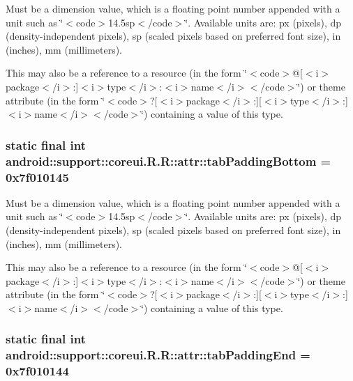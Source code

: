 Must be a dimension value, which is a floating point number appended with a unit such as \char`\"{}$<$code$>$14.5sp$<$/code$>$\char`\"{}. Available units are: px (pixels), dp (density-independent pixels), sp (scaled pixels based on preferred font size), in (inches), mm (millimeters). 

This may also be a reference to a resource (in the form \char`\"{}$<$code$>$@\mbox{[}$<$i$>$package$<$/i$>$:\mbox{]}$<$i$>$type$<$/i$>$:$<$i$>$name$<$/i$>$$<$/code$>$\char`\"{}) or theme attribute (in the form \char`\"{}$<$code$>$?\mbox{[}$<$i$>$package$<$/i$>$:\mbox{]}\mbox{[}$<$i$>$type$<$/i$>$:\mbox{]}$<$i$>$name$<$/i$>$$<$/code$>$\char`\"{}) containing a value of this type. \hypertarget{classandroid_1_1support_1_1coreui_1_1_r_1_1attr_3355ae25fdc31dd76bb81508ba403a86}{
\subsubsection[{tabPaddingBottom}]{\setlength{\rightskip}{0pt plus 5cm}static final int android::support::coreui.R.R::attr::tabPaddingBottom = 0x7f010145}}
\label{classandroid_1_1support_1_1coreui_1_1_r_1_1attr_3355ae25fdc31dd76bb81508ba403a86}


Must be a dimension value, which is a floating point number appended with a unit such as \char`\"{}$<$code$>$14.5sp$<$/code$>$\char`\"{}. Available units are: px (pixels), dp (density-independent pixels), sp (scaled pixels based on preferred font size), in (inches), mm (millimeters). 

This may also be a reference to a resource (in the form \char`\"{}$<$code$>$@\mbox{[}$<$i$>$package$<$/i$>$:\mbox{]}$<$i$>$type$<$/i$>$:$<$i$>$name$<$/i$>$$<$/code$>$\char`\"{}) or theme attribute (in the form \char`\"{}$<$code$>$?\mbox{[}$<$i$>$package$<$/i$>$:\mbox{]}\mbox{[}$<$i$>$type$<$/i$>$:\mbox{]}$<$i$>$name$<$/i$>$$<$/code$>$\char`\"{}) containing a value of this type. \hypertarget{classandroid_1_1support_1_1coreui_1_1_r_1_1attr_e0c82387f7d8b4eefa63e679f6ef6337}{
\subsubsection[{tabPaddingEnd}]{\setlength{\rightskip}{0pt plus 5cm}static final int android::support::coreui.R.R::attr::tabPaddingEnd = 0x7f010144}}
\label{classandroid_1_1support_1_1coreui_1_1_r_1_1attr_e0c82387f7d8b4eefa63e679f6ef6337}


